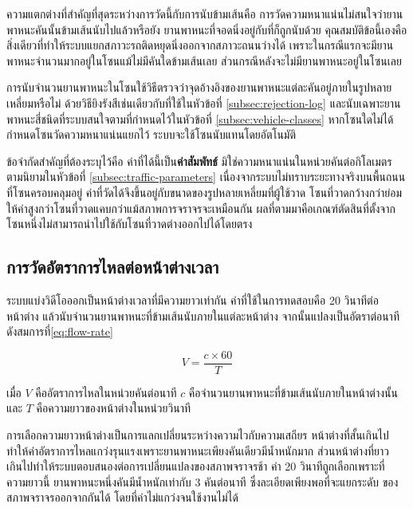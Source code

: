 ความแตกต่างที่สำคัญที่สุดระหว่างการวัดนี้กับการนับข้ามเส้นคือ การวัดความหนาแน่นไม่สนใจว่ายานพาหนะคันนั้นข้ามเส้นนับไปแล้วหรือยัง ยานพาหนะที่จอดนิ่งอยู่กับที่ก็ถูกนับด้วย  คุณสมบัติข้อนี้เองคือสิ่งเดียวที่ทำให้ระบบแยกสภาวะรถติดหยุดนิ่งออกจากสภาวะถนนว่างได้ เพราะในกรณีแรกจะมียานพาหนะจำนวนมากอยู่ในโซนแม้ไม่มีคันใดข้ามเส้นเลย ส่วนกรณีหลังจะไม่มียานพาหนะอยู่ในโซนเลย

การนับจำนวนยานพาหนะในโซนใช้วิธีตรวจว่าจุดอ้างอิงของยานพาหนะแต่ละคันอยู่ภายในรูปหลายเหลี่ยมหรือไม่ ด้วยวิธียิงรังสีเช่นเดียวกับที่ใช้ในหัวข้อที่ \ref{subsec:rejection-log} และนับเฉพาะยานพาหนะสี่ชนิดที่ระบบสนใจตามที่กำหนดไว้ในหัวข้อที่ \ref{subsec:vehicle-classes}  หากโซนใดไม่ได้กำหนดโซนวัดความหนาแน่นแยกไว้ ระบบจะใช้โซนนับแทนโดยอัตโนมัติ

ข้อจำกัดสำคัญที่ต้องระบุไว้คือ ค่าที่ได้นี้เป็น\textbf{ค่าสัมพัทธ์} มิใช่ความหนาแน่นในหน่วยคันต่อกิโลเมตรตามนิยามในหัวข้อที่ \ref{subsec:traffic-parameters} เนื่องจากระบบไม่ทราบระยะทางจริงบนพื้นถนนที่โซนครอบคลุมอยู่  ค่าที่วัดได้จึงขึ้นอยู่กับขนาดของรูปหลายเหลี่ยมที่ผู้ใช้วาด โซนที่วาดกว้างกว่าย่อมให้ค่าสูงกว่าโซนที่วาดแคบกว่าแม้สภาพการจราจรจะเหมือนกัน ผลที่ตามมาคือเกณฑ์ตัดสินที่ตั้งจากโซนหนึ่งไม่สามารถนำไปใช้กับโซนที่วาดต่างออกไปได้โดยตรง

\subsection{การวัดอัตราการไหลต่อหน้าต่างเวลา}
\label{subsec:flow-rate}

ระบบแบ่งวิดีโอออกเป็นหน้าต่างเวลาที่มีความยาวเท่ากัน ค่าที่ใช้ในการทดสอบคือ 20 วินาทีต่อหน้าต่าง
แล้วนับจำนวนยานพาหนะที่ข้ามเส้นนับภายในแต่ละหน้าต่าง จากนั้นแปลงเป็นอัตราต่อนาที
ดังสมการที่\ref{eq:flow-rate}

\begin{equation}
    V = \frac{c \times 60}{T}
    \label{eq:flow-rate}
\end{equation}

เมื่อ $V$ คืออัตราการไหลในหน่วยคันต่อนาที $c$ คือจำนวนยานพาหนะที่ข้ามเส้นนับภายในหน้าต่างนั้น และ $T$ คือความยาวของหน้าต่างในหน่วยวินาที

การเลือกความยาวหน้าต่างเป็นการแลกเปลี่ยนระหว่างความไวกับความเสถียร หน้าต่างที่สั้นเกินไป
ทำให้ค่าอัตราการไหลแกว่งรุนแรงเพราะยานพาหนะเพียงคันเดียวมีน้ำหนักมาก ส่วนหน้าต่างที่ยาว
เกินไปทำให้ระบบตอบสนองต่อการเปลี่ยนแปลงของสภาพจราจรช้า ค่า 20 วินาทีถูกเลือกเพราะที่
ความยาวนี้ ยานพาหนะหนึ่งคันมีน้ำหนักเท่ากับ 3 คันต่อนาที ซึ่งละเอียดเพียงพอที่จะแยกระดับ
ของสภาพจราจรออกจากกันได้ โดยที่ค่าไม่แกว่งจนใช้งานไม่ได้

